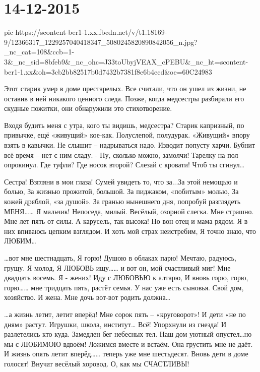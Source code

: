  
 
 
 
 
\section{14-12-2015}


\ifcmt
  pic https://scontent-ber1-1.xx.fbcdn.net/v/t1.18169-9/12366317_1229257040418347_5080245820890842056_n.jpg?_nc_cat=108&ccb=1-3&_nc_sid=8bfeb9&_nc_ohc=J33toUbyjVEAX_cPEBU&_nc_ht=scontent-ber1-1.xx&oh=3cb2bb82517b0d7432b7381f8e6b4ecd&oe=60C24983
\fi


Этот старик умер в доме престарелых. Все считали, что он ушел из жизни, не
оставив в ней никакого ценного следа. Позже, когда медсестры разбирали его
скудные пожитки, они обнаружили это стихотворение.

Входя будить меня с утра, кого ты видишь, медсестра? Старик капризный, по
привычке, ещё «живущий» кое-как. Полуслепой, полудурак. «Живущий» впору взять в
кавычки. Не слышит – надрываться надо. Изводит попусту харчи. Бубнит всё время
– нет с ним сладу. - Ну, сколько можно, замолчи! Тарелку на пол опрокинул. Где
туфли? Где носок второй? Слезай с кровати! Чтоб ты сгинул…

Сестра! Взгляни в мои глаза! Сумей увидеть то, что за...За этой немощью и
болью, За жизнью прожитой, большой. За пиджаком, «побитым» молью, За кожей
дряблой, «за душой». За гранью нынешнего дня, попробуй разглядеть МЕНЯ…… Я
мальчик! Непоседа, милый. Весёлый, озорной слегка. Мне страшно. Мне лет пять от
силы. А карусель, так высока! Но вон отец и мама рядом. Я в них впиваюсь цепким
взглядом. И хоть мой страх неистребим, Я точно знаю, что ЛЮБИМ…

…вот мне шестнадцать, Я горю! Душою в облаках парю! Мечтаю, радуюсь, грущу. Я
молод, Я ЛЮБОВЬ ищу…… и вот он, мой счастливый миг! Мне двадцать восемь. Я -
жених! Иду с ЛЮБОВЬЮ к алтарю, И вновь горю, горю, горю…… мне тридцать пять,
растёт семья. У нас уже есть сыновья. Свой дом, хозяйство. И жена. Мне дочь
вот-вот родить должна…

…а жизнь летит, летит вперёд! Мне сорок пять – «круговорот»! И дети «не по
дням» растут. Игрушки, школа, институт… Всё! Упорхнули из гнезда! И разлетелись
кто куда. Замедлен бег небесных тел. Наш дом уютный опустел…но мы с ЛЮБИМОЮ
вдвоём! Ложимся вместе и встаём. Она грустить мне не даёт. И жизнь опять летит
вперёд…… теперь уже мне шестьдесят. Вновь дети в доме голосят! Внучат весёлый
хоровод. О, как мы СЧАСТЛИВЫ!

